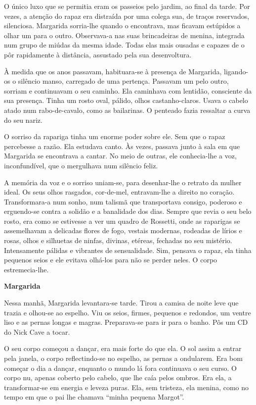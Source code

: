 O único luxo que se permitia eram os passeios pelo jardim, ao final da
tarde. Por vezes, a atenção do rapaz era distraída por uma colega sua,
de traços reservados, silenciosa. Margarida sorria-lhe quando o
encontrava, mas ficavam estúpidos a olhar um para o outro. Observava-a
nas suas brincadeiras de menina, integrada num grupo de miúdas da mesma
idade. Todas elas mais ousadas e capazes de o pôr rapidamente à
distância, assustado pela sua desenvoltura.

À medida que os anos passavam, habituara-se à presença de Margarida,
ligando-os o silêncio manso, carregado de uma pertença. Passavam um pelo
outro, sorriam e continuavam o seu caminho. Ela caminhava com lentidão,
consciente da sua presença. Tinha um rosto oval, pálido, olhos
castanho-claros. Usava o cabelo atado num rabo-de-cavalo, como as
bailarinas. O penteado fazia ressaltar a curva do seu nariz.

O sorriso da rapariga tinha um enorme poder sobre ele. Sem que o rapaz
percebesse a razão. Ela estudava canto. Às vezes, passava junto à sala
em que Margarida se encontrava a cantar. No meio de outras, ele
conhecia-lhe a voz, inconfundível, que o mergulhava num silêncio feliz.

A memória da voz e o sorriso uniam-se, para desenhar-lhe o retrato da
mulher ideal. Os seus olhos rasgados, cor-de-mel, entravam-lhe a direito
no coração. Transformara-a num sonho, num talismã que transportava
consigo, poderoso e erguendo-se contra a solidão e a banalidade dos
dias. Sempre que revia o seu belo rosto, era como se estivesse a ver um
quadro de Rossetti, onde as raparigas se assemelhavam a delicadas flores
de fogo, vestais modernas, rodeadas de lírios e rosas, olhos e silhuetas
de ninfas, divinas, etéreas, fechadas no seu mistério. Intensamente
pálidas e vibrantes de sensualidade. Sim, pensava o rapaz, ela tinha
pequenos seios e ele evitava olhá-los para não se perder neles. O corpo
estremecia-lhe.

\vspace*{1.8cm}
\noindent{}\textbf{Margarida}

\bigskip

Nessa manhã, Margarida levantara-se tarde. Tirou a camisa de noite leve
que trazia e olhou-se ao espelho. Viu os seios, firmes, pequenos e
redondos, um ventre liso e as pernas longas e magras. Preparava-se para
ir para o banho. Pôs um CD do Nick Cave a tocar.

O seu corpo começou a dançar, era mais forte do que ela. O sol assim a
entrar pela janela, o corpo reflectindo-se no espelho, as pernas a
ondularem. Era bom começar o dia a dançar, enquanto o mundo lá fora
continuava o seu curso. O corpo nu, apenas coberto pelo cabelo, que lhe
caía pelos ombros. Era ela, a transformar-se em energia e leveza puras.
Ela, sem tristeza, ela menina, como no tempo em que o pai lhe chamava
``minha pequena Margot''.

